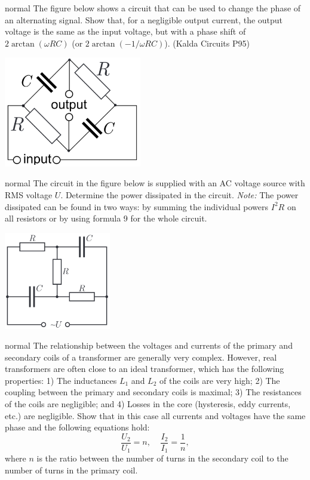 \hypertarget{P156}{}
\begin{solution}{normal} %
The figure below shows a circuit that can be used to change the phase of an alternating signal. Show that, for a negligible output current, the output voltage is the same as the input voltage, but with a phase shift of $2\arctan(\omega RC)$ (or $2\arctan(-1/\omega RC)$). (Kalda Circuits P95)
\begin{center}
    \includegraphics[width=0.45\textwidth]{S6 Figures/S6-156.png}
\end{center}
\end{solution}
\newpage
\hypertarget{P157}{}
\begin{solution}{normal} %
The circuit in the figure below is supplied with an AC voltage source with RMS voltage $U$. Determine the power dissipated in the circuit. \textit{Note:} The power dissipated can be found in two ways: by summing the individual powers $I^2R$ on all resistors or by using formula 9 for the whole circuit.
\begin{center}
    \includegraphics[width=0.35\textwidth]{S6 Figures/S6-157.png}
\end{center}
\end{solution}

\hypertarget{P158}{}
\begin{solution}{normal} %
The relationship between the voltages and currents of the primary and secondary coils of a transformer are generally very complex. However, real transformers are often close to an ideal transformer, which has the following properties: 1) The inductances $L_1$ and $L_2$ of the coils are very high; 2) The coupling between the primary and secondary coils is maximal; 3) The resistances of the coils are negligible; and 4) Losses in the core (hysteresis, eddy currents, etc.) are negligible. Show that in this case all currents and voltages have the same phase and the following equations hold:
$$\dfrac{U_2}{U_1}=n,\;\;\;\;\dfrac{I_2}{I_1}=\dfrac{1}{n},$$
where $n$ is the ratio between the number of turns in the secondary coil to the number of turns in the primary coil.
\end{solution}

